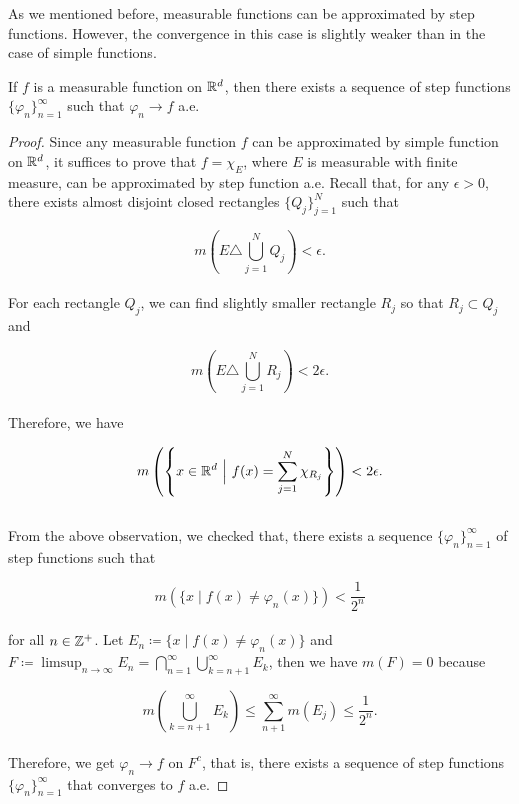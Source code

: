 \documentclass[12pt, a4paper, openany, twoside]{book}
\theoremstyle{definition}
\theoremstyle{remark}
\theoremstyle{plain}
\numberwithin{equation}{section}
\begin{document}
As we mentioned before, measurable functions can be approximated by step functions. However, the convergence in this case is slightly weaker than in the case of simple functions.

\vspace{5mm}
\begin{tcolorbox}[colback=yellow!10!white,colframe=red!75!black,title=Theorem 1.4.10]\label{Theorem 1.4.10}
    If $f$ is a measurable function on ${\mathbb {R}}^d$, then there exists a sequence of step functions $\{\varphi_n\}_{n=1}^{\infty}$ such that $\varphi_n\rightarrow f$ a.e. 
\end{tcolorbox}
\begin{proof}
    Since any measurable function $f$ can be approximated by simple function on ${\mathbb {R}}^d$, it suffices to prove that $f=\chi_{E}$, where $E$ is measurable with finite measure, can be approximated by step function a.e. Recall that, for any $\epsilon>0$, there exists almost disjoint closed rectangles $\{Q_j\}_{j=1}^{N}$ such that 

    \[m\left(E\triangle \bigcup_{j=1}^{N}{Q_j}\right)<\epsilon.\]
    \\
    For each rectangle $Q_j$, we can find slightly smaller rectangle $R_j$ so that $R_j\subset Q_j$ and 

    \[m\left(E\triangle \bigcup_{j=1}^{N}{R_j}\right)<2\epsilon.\]
    \\
    Therefore, we have

    \[m\left(\left\{x\in\BR^d\ \Big|\ f(x)=\sum_{j=1}^{N}{\chi_{R_j}}\right\}\right)<2\epsilon.\]
    \\
    \indent From the above observation, we checked that, there exists a sequence $\{\varphi_n\}_{n=1}^\infty$ of step functions such that
    
    \[m(\{x\mid f(x)\neq\varphi_n(x)\})<\frac{1}{2^n}\]
    \\
    for all $n\in{\mathbb {Z}}^+$. Let $E_n\coloneqq \{x\mid f(x)\neq \varphi_n(x)\}$ and $F\coloneqq\limsup_{n\rightarrow\infty}{E_n}=\bigcap_{n=1}^{\infty}{\bigcup_{k=n+1}^\infty{E_k}}$, then we have $m(F)=0$ because

    \[m\left(\bigcup_{k=n+1}^{\infty}{E_k}\right)\leq\sum_{n+1}^{\infty}{m(E_j)}\leq\frac{1}{2^n}.\]
    \\
    Therefore, we get $\varphi_n\rightarrow f$ on $F^c$, that is, there exists a sequence of step functions $\{\varphi_n\}_{n=1}^{\infty}$ that converges to $f$ a.e.
\end{proof}
\vspace{5mm}
\end{document}
